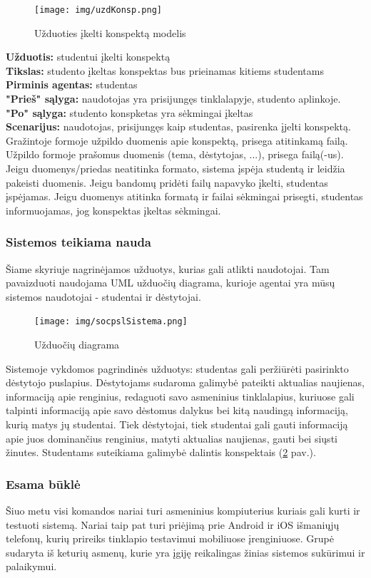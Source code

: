 \documentclass{VUMIFPSkursinis}
\begin{document}
\begin{figure}[H]
\centering
\texttt{[image: img/uzdKonsp.png]}
\caption{Užduoties įkelti konspektą modelis}
\label{fig:konspektas}
\end{figure}
\textbf{Užduotis: } studentui įkelti konspektą\\
\textbf{Tikslas: } studento įkeltas konspektas bus prieinamas kitiems studentams\\
\textbf{Pirminis agentas: } studentas\\
\textbf{"Prieš" sąlyga: } naudotojas yra prisijungęs tinklalapyje, studento aplinkoje.\\
\textbf{"Po" sąlyga: } studento konspketas yra sėkmingai įkeltas\\
\textbf{Scenarijus: } naudotojas, prisijungęs kaip studentas, pasirenka įjelti konspektą. Gražintoje formoje užpildo duomenis apie konspektą, prisega atitinkamą failą. Užpildo formoje prašomus duomenis (tema, dėstytojas, ...), prisega failą(-us). Jeigu duomenys/priedas neatitinka formato, sistema įspėja studentą ir leidžia pakeisti duomenis. Jeigu bandomų pridėti failų napavyko įkelti, studentas įspėjamas. Jeigu duomenys atitinka formatą ir failai sėkmingai prisegti, studentas informuojamas, jog konspektas įkeltas sėkmingai.
\endgroup
\subsubsection{Sistemos teikiama nauda}
Šiame skyriuje nagrinėjamos užduotys, kurias gali atlikti naudotojai. Tam pavaizduoti naudojama UML užduočių diagrama, kurioje agentai yra mūsų sistemos naudotojai - studentai ir dėstytojai.
\begin{figure}[H]
\centering
\texttt{[image: img/socpslSistema.png]}
\caption{Užduočių diagrama}
\label{fig:uzdDiagram}
\end{figure}
Sistemoje vykdomos pagrindinės užduotys: studentas gali peržiūrėti pasirinkto dėstytojo puslapius. Dėstytojams sudaroma galimybė pateikti aktualias naujienas, informaciją apie renginius, redaguoti savo asmeninius tinklalapius, kuriuose gali talpinti informaciją apie savo dėstomus dalykus bei kitą naudingą informaciją, kurią matys jų studentai. Tiek dėstytojai, tiek studentai gali gauti informaciją apie juos dominančius renginius, matyti aktualias naujienas, gauti bei siųsti žinutes. Studentams suteikiama galimybė dalintis konspektais (\ref{fig:uzdDiagram} pav.).
\subsubsection{Esama būklė}
Šiuo metu visi komandos nariai turi asmeninius kompiuterius kuriais gali kurti ir testuoti sistemą. Nariai taip pat turi priėjimą prie Android ir iOS išmaniųjų telefonų, kurių prireiks tinklapio testavimui mobiliuose įrenginiuose. Grupė sudaryta iš keturių asmenų, kurie yra įgiję reikalingas žinias sistemos sukūrimui ir palaikymui.
\end{document}
